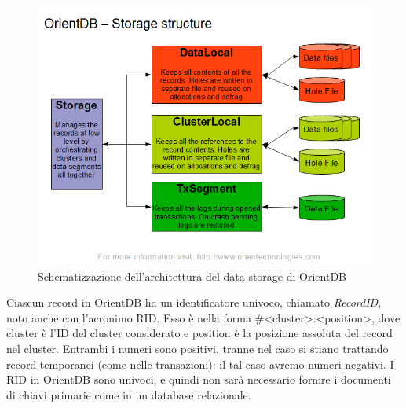 \begin{figure}
\centering
\includegraphics[scale=0.5]{./orient.png}
\caption{Schematizzazione dell'architettura del data storage di OrientDB}
\label{fig:1}
\end{figure}

Ciascun record in OrientDB ha un identificatore univoco, chiamato \emph{RecordID}, noto anche con l'acronimo RID. Esso è nella forma \#<cluster>:<position>, dove cluster è l'ID del cluster considerato e position è la posizione assoluta del record nel cluster. Entrambi i numeri sono positivi, tranne nel caso si stiano trattando record temporanei (come nelle transazioni): il tal caso avremo numeri negativi. I RID in OrientDB sono univoci, e quindi non sarà necessario fornire i documenti di chiavi primarie come in un database relazionale.

